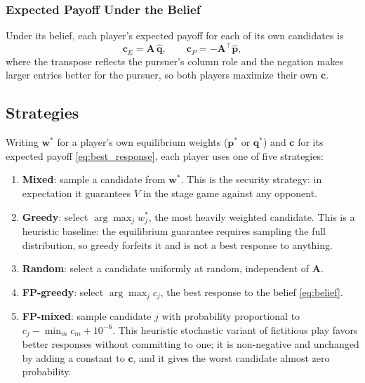 \subsubsection{Expected Payoff Under the Belief}

Under its belief, each player's expected payoff for each of its own candidates is
%
\begin{equation}
    \mathbf{c}_E = \mathbf{A}\,\hat{\mathbf{q}}, \qquad
    \mathbf{c}_P = -\mathbf{A}^\top \hat{\mathbf{p}},
    \label{eq:best_response}
\end{equation}
%
where the transpose reflects the pursuer's column role and the negation makes larger entries better for the pursuer, so both players maximize their own $\mathbf{c}$.


\subsection{Strategies}
\label{sec:strategies}

Writing $\mathbf{w}^*$ for a player's own equilibrium weights ($\mathbf{p}^*$ or $\mathbf{q}^*$) and $\mathbf{c}$ for its expected payoff \eqref{eq:best_response}, each player uses one of five strategies:
%
\begin{enumerate}
    \item \textbf{Mixed}: sample a candidate from $\mathbf{w}^*$. This is the security strategy: in expectation it guarantees $V$ in the stage game against any opponent.
    \item \textbf{Greedy}: select $\arg\max_j w^*_j$, the most heavily weighted candidate. This is a heuristic baseline: the equilibrium guarantee requires sampling the full distribution, so greedy forfeits it and is not a best response to anything.
    \item \textbf{Random}: select a candidate uniformly at random, independent of $\mathbf{A}$.
    \item \textbf{FP-greedy}: select $\arg\max_j c_j$, the best response to the belief \eqref{eq:belief}.
    \item \textbf{FP-mixed}: sample candidate $j$ with probability proportional to $c_j - \min_m c_m + 10^{-6}$. This heuristic stochastic variant of fictitious play favors better responses without committing to one; it is non-negative and unchanged by adding a constant to $\mathbf{c}$, and it gives the worst candidate almost zero probability.
\end{enumerate}
